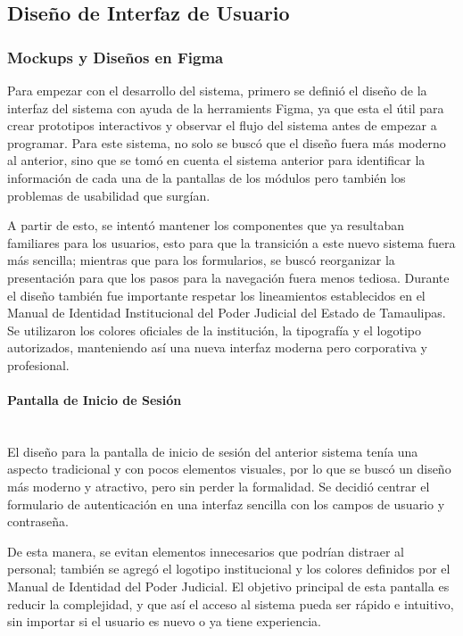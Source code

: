 \subsection{Diseño de Interfaz de Usuario}
\label{sec:diseño_interfaz}

\subsubsection{Mockups y Diseños en Figma}
\label{sec:mockups_diseños_figma}
Para empezar con el desarrollo del sistema, primero se definió el diseño de la interfaz del sistema con ayuda de la herramients Figma, ya que esta el útil para crear prototipos interactivos y observar el flujo del sistema antes de empezar a programar.
Para este sistema, no solo se buscó que el diseño fuera más moderno al anterior, sino que se tomó en cuenta el sistema anterior para identificar la información de cada una de la pantallas de los módulos pero también los problemas de usabilidad que surgían.

A partir de esto, se intentó mantener los componentes que ya resultaban familiares para los usuarios, esto para que la transición a este nuevo sistema fuera más sencilla; mientras que para los formularios, se buscó reorganizar la presentación para que los pasos para la navegación fuera menos tediosa.
Durante el diseño también fue importante respetar los lineamientos establecidos en el Manual de Identidad Institucional del Poder Judicial del Estado de Tamaulipas. Se utilizaron los colores oficiales de la institución, la tipografía y el logotipo autorizados, manteniendo así una nueva interfaz moderna pero corporativa y profesional.

\paragraph{Pantalla de Inicio de Sesión} ~\\
\label{sec:inicio_sesion}El diseño para la pantalla de inicio de sesión del anterior sistema tenía una aspecto tradicional y con pocos elementos visuales, por lo que se buscó un diseño más moderno y atractivo, pero sin perder la formalidad.
Se decidió centrar el formulario de autenticación en una interfaz sencilla con los campos de usuario y contraseña. 

De esta manera, se evitan elementos innecesarios que podrían distraer al personal; también se agregó el logotipo institucional y los colores definidos por el Manual de Identidad del Poder Judicial.
El objetivo principal de esta pantalla es reducir la complejidad, y que así el acceso al sistema pueda ser rápido e intuitivo, sin importar si el usuario es nuevo o ya tiene experiencia.

